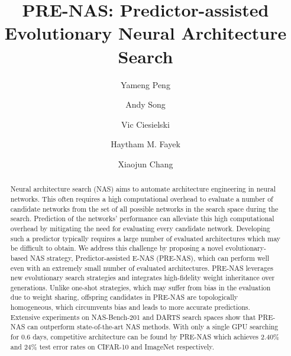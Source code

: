 \documentclass[sigconf]{acmart}
\begin{document}
\title{PRE-NAS: Predictor-assisted Evolutionary Neural Architecture Search}



\author{Yameng Peng}

\author{Andy Song}

\author{Vic Ciesielski}

\author{Haytham M. Fayek}

\author{Xiaojun Chang}

\renewcommand{\shortauthors}{Peng, et al.}

\begin{abstract}
Neural architecture search (NAS) aims to automate architecture engineering in neural networks. This often requires a high computational overhead to evaluate a number of candidate networks from the set of all possible networks in the search space during the search.  Prediction of the networks' performance can alleviate this high computational overhead by mitigating the need for evaluating every candidate network.  Developing such a predictor typically requires a large number of evaluated architectures which may be difficult to obtain.  We address this challenge by proposing a novel evolutionary-based NAS strategy, Predictor-assisted E-NAS (PRE-NAS), which can perform well even with an extremely small number of evaluated architectures.  PRE-NAS leverages new evolutionary search strategies and integrates high-fidelity weight inheritance over generations.  Unlike one-shot strategies, which may suffer from bias in the evaluation due to weight sharing, offspring candidates in PRE-NAS are topologically homogeneous, which circumvents bias and leads to more accurate predictions.  Extensive experiments on NAS-Bench-201 and DARTS search spaces show that PRE-NAS can outperform state-of-the-art NAS methods.  With only a single GPU searching for 0.6 days, competitive architecture can be found by PRE-NAS which achieves 2.40\% and 24\% test error rates on CIFAR-10 and ImageNet respectively.
\end{abstract}
\end{document}
